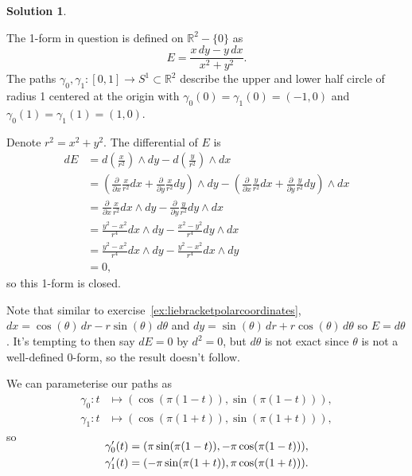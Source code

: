\documentclass[11pt, a4paper]{report}
\theoremstyle{definition}
\newtheorem{sol}{Solution}[part]
\begin{document}
\begin{sol}\label{sol:closedbutpathdependent}

The 1-form in question is defined on $\mathbb{R}^2 - \{0\}$ as
\[
    E = \frac{x \, dy - y \, dx}{x^2 + y^2}.
\]
The paths $\gamma_0, \gamma_1 : [0, 1] \to S^1 \subset \mathbb{R}^2$ describe the upper and lower half circle of radius 1 centered at the origin with $\gamma_0(0) = \gamma_1(0) = (-1, 0)$ and $\gamma_0(1) = \gamma_1(1) = (1, 0)$.

Denote $r^2 = x^2 + y^2$. The differential of $E$ is
\begin{align*}
    dE &= d \left(\frac{x}{r^2}\right) \wedge dy
          - d \left(\frac{y}{r^2} \right)\wedge dx \\
       &= \left(\frac{\partial}{\partial x} \frac{x}{r^2} dx
                + \frac{\partial}{\partial y} \frac{x}{r^2} dy\right) \wedge dy
          - \left(\frac{\partial}{\partial x} \frac{y}{r^2} dx
                  + \frac{\partial}{\partial y} \frac{y}{r^2} dy\right) \wedge dx \\
       &= \frac{\partial}{\partial x} \frac{x}{r^2} dx \wedge dy
          - \frac{\partial}{\partial y} \frac{y}{r^2} dy \wedge dx \\
       &= \frac{y^2 - x^2}{r^4} dx \wedge dy - \frac{x^2 - y^2}{r^4} dy \wedge dx \\
       &= \frac{y^2 - x^2}{r^4} dx \wedge dy - \frac{y^2 - x^2}{r^4} dx \wedge dy \\
       &= 0,
\end{align*}
so this 1-form is closed.

Note that similar to exercise~\ref{ex:liebracketpolarcoordinates}, $dx = \cos(\theta) \, dr - r \sin(\theta) \, d\theta$ and $dy = \sin(\theta) \, dr + r \cos(\theta) \, d\theta$ so $E = d \theta$. It's tempting to then say $dE = 0$ by $d^2 = 0$, but $d\theta$ is not exact since $\theta$ is not a well-defined 0-form, so the result doesn't follow.

We can parameterise our paths as
\begin{align*}
    \gamma_0: t &\mapsto (\cos(\pi(1 - t)), \sin(\pi(1 - t))), \\
    \gamma_1: t &\mapsto (\cos(\pi(1 + t)), \sin(\pi(1 + t))),
\end{align*}
so
\begin{align*}
    \SwapAboveDisplaySkip
    \gamma_0'(t) &= (\pi \sin(\pi(1 - t)), -\pi \cos(\pi(1 - t))), \\
    \gamma_1'(t) &= (-\pi \sin(\pi(1 + t)), \pi \cos(\pi(1 + t))).
\end{align*}


\end{sol}
\end{document}
